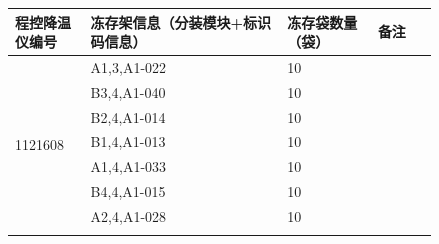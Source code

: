 \documentclass[UTF8,10pt,a4paper,fontset=fandol]{ctexart}
\newcommand{\fieldvalue}[1]{#1}
\newcommand{\handwritten}[1]{#1}
\begin{document}
\small
\begin{tabular}{|p{0.15\linewidth}|p{0.39\linewidth}|p{0.18\linewidth}|p{0.12\linewidth}|}
\hline
程控降温仪编号 & 冻存架信息（分装模块+标识码信息） & 冻存袋数量（袋） & 备注 \\ \hline

\multirow{9}{*}{\fieldvalue{\handwritten{1121608}}}
&
\fieldvalue{\handwritten{A1,3,A1-022}}
&
\fieldvalue{\handwritten{10}} & \\ \cline{2-4}

&
\fieldvalue{\handwritten{B3,4,A1-040}}
&
\fieldvalue{\handwritten{10}} & \\ \cline{2-4}

&
\fieldvalue{\handwritten{B2,4,A1-014}}
&
\fieldvalue{\handwritten{10}} & \\ \cline{2-4}

&
\fieldvalue{\handwritten{B1,4,A1-013}}
&
\fieldvalue{\handwritten{10}} & \\ \cline{2-4}

&
\fieldvalue{\handwritten{A1,4,A1-033}}
&
\fieldvalue{\handwritten{10}} & \\ \cline{2-4}

&
\fieldvalue{\handwritten{B4,4,A1-015}}
&
\fieldvalue{\handwritten{10}} & \\ \cline{2-4}

&
\fieldvalue{\handwritten{A2,4,A1-028}}
&
\fieldvalue{\handwritten{10}} & \\ \cline{2-4}


\end{tabular}
\end{document}
